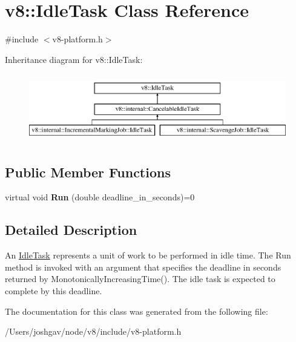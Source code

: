 \hypertarget{classv8_1_1_idle_task}{}\section{v8\+:\+:Idle\+Task Class Reference}
\label{classv8_1_1_idle_task}


{\ttfamily \#include $<$v8-\/platform.\+h$>$}

Inheritance diagram for v8\+:\+:Idle\+Task\+:\begin{figure}[H]
\begin{center}
\leavevmode
\includegraphics[height=3.000000cm]{classv8_1_1_idle_task}
\end{center}
\end{figure}
\subsection*{Public Member Functions}
\begin{DoxyCompactItemize}
\item 
virtual void {\bfseries Run} (double deadline\+\_\+in\+\_\+seconds)=0\hypertarget{classv8_1_1_idle_task_a4f2f238f551b3b2212adffcd5ee2f314}{}\label{classv8_1_1_idle_task_a4f2f238f551b3b2212adffcd5ee2f314}

\end{DoxyCompactItemize}


\subsection{Detailed Description}
An \hyperlink{classv8_1_1_idle_task}{Idle\+Task} represents a unit of work to be performed in idle time. The Run method is invoked with an argument that specifies the deadline in seconds returned by Monotonically\+Increasing\+Time(). The idle task is expected to complete by this deadline. 

The documentation for this class was generated from the following file\+:\begin{DoxyCompactItemize}
\item 
/\+Users/joshgav/node/v8/include/v8-\/platform.\+h\end{DoxyCompactItemize}
